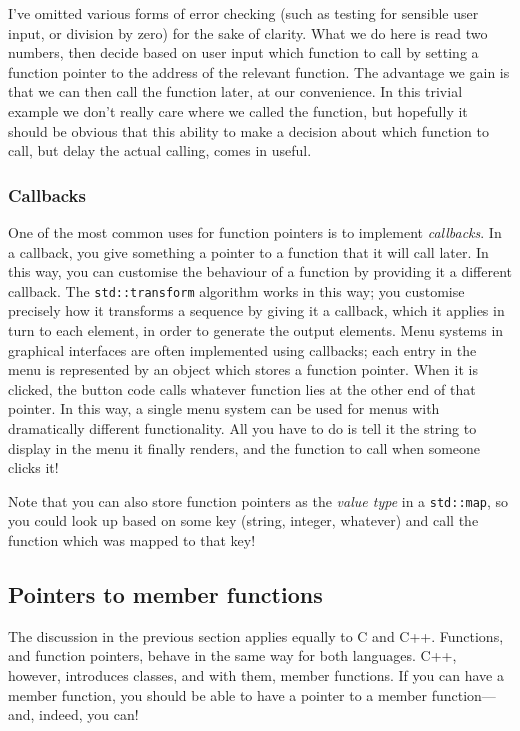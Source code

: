 \documentclass[a4paper]{scrartcl}
\begin{document}
I've omitted various forms of error checking (such as testing for sensible user input, or division by zero) for the sake of clarity. What we do here is read two numbers, then decide based on user input which function to call by setting a function pointer to the address of the relevant function. The advantage we gain is that we can then call the function later, at our convenience. In this trivial example we don't really care where we called the function, but hopefully it should be obvious that this ability to make a decision about which function to call, but delay the actual calling, comes in useful.

\subsubsection{Callbacks}
One of the most common uses for function pointers is to implement \emph{callbacks}. In a callback, you give something a pointer to a function that it will call later. In this way, you can customise the behaviour of a function by providing it a different callback. The \texttt{std::transform} algorithm works in this way; you customise precisely how it transforms a sequence by giving it a callback, which it applies in turn to each element, in order to generate the output elements. Menu systems in graphical interfaces are often implemented using callbacks; each entry in the menu is represented by an object which stores a function pointer. When it is clicked, the button code calls whatever function lies at the other end of that pointer. In this way, a single menu system can be used for menus with dramatically different functionality. All you have to do is tell it the string to display in the menu it finally renders, and the function to call when someone clicks it!

Note that you can also store function pointers as the \emph{value type} in a \texttt{std::map}, so you could look up based on some key (string, integer, whatever) and call the function which was mapped to that key!

\subsection{Pointers to member functions}
The discussion in the previous section applies equally to C and C++. Functions, and function pointers, behave in the same way for both languages. C++, however, introduces classes, and with them, member functions. If you can have a member function, you should be able to have a pointer to a member function---and, indeed, you can!
\end{document}
